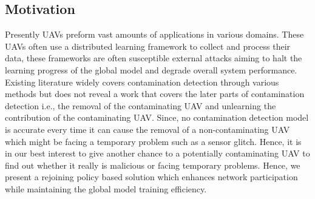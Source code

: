 \documentclass[10pt,journal,compsoc]{IEEEtran}
\begin{document}
\subsection{Motivation}
Presently UAVs preform vast amounts of applications in various domains. These UAVs often use a distributed learning framework to collect and process their data, these frameworks are often susceptible external attacks aiming to halt the learning progress of the global model and degrade overall system performance. Existing literature widely covers contamination detection through various methods but does not reveal a work that covers the later parts of contamination detection i.e., the removal of the contaminating UAV and unlearning the contribution of the contaminating UAV. Since, no contamination detection model is accurate every time it can cause the removal of a non-contaminating UAV which might be facing a temporary problem such as a sensor glitch. Hence, it is in our best interest to give another chance to a potentially contaminating UAV to find out whether it really is malicious or facing temporary problems. Hence, we present a rejoining policy based solution which enhances network participation while maintaining the global model training efficiency.
\end{document}
